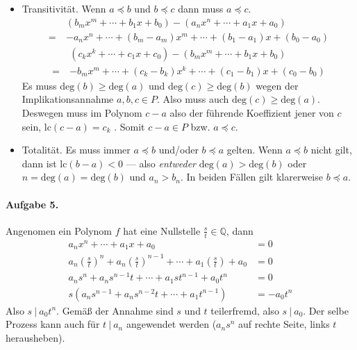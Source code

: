 \documentclass{article}
\begin{document}
\begin{enumerate}
\begin{itemize}
        \item Transitivität. Wenn $a \preccurlyeq b$ und $b \preccurlyeq c$ dann muss $a \preccurlyeq c$.
        \begin{align*}
            &(b_mx^m + \cdots + b_1x + b_0) - (a_nx^n + \cdots + a_1x + a_0) \\
            =\ &-a_nx^n + \cdots + (b_m - a_m)x^m + \cdots + (b_1 - a_1)x + (b_0 - a_0) 
        \end{align*}
        \begin{align*}
            &(c_kx^k + \cdots + c_1x + c_0) - (b_mx^m + \cdots + b_1x + b_0) \\
            =\ &-b_mx^m + \cdots + (c_k - b_k)x^k + \cdots + (c_1 - b_1)x + (c_0 - b_0) 
        \end{align*}
        Es muss $\text{deg}(b) \geq \text{deg}(a)$ und $\text{deg}(c) \geq \text{deg}(b)$ wegen der Implikationsannahme $a, b, c \in P$. Also muss auch $\text{deg}(c) \geq \text{deg}(a)$. Deswegen muss im Polynom $c - a$ also der führende Koeffizient jener von $c$ sein, $\text{lc}(c - a) = c_k$ . Somit $c - a \in P$ bzw. $a \preccurlyeq c$.
        

        \item Totalität. Es muss immer $a \preccurlyeq b$ und/oder $b \preccurlyeq a$ gelten. Wenn $a \preccurlyeq b$ nicht gilt, dann ist $\text{lc}(b - a) < 0$ --- also \emph{entweder} $\text{deg}(a) > \text{deg}(b)$ oder $n = \text{deg}(a) = \text{deg}(b)$ und $a_n > b_n$. In beiden Fällen gilt klarerweise $b \preccurlyeq a$.
    \end{itemize}
\end{enumerate}

\paragraph{Aufgabe 5.} Angenomen ein Polynom $f$ hat eine Nullstelle $\frac{s}{t} \in \mathbb{Q}$, dann
\begin{align*}
    a_nx^n + \cdots + a_1x + a_0 &= 0 \\
    a_n\left(\frac{s}{t}\right)^n + a_n\left(\frac{s}{t}\right)^{n - 1} + \cdots + a_1\left(\frac{s}{t}\right) + a_0 &= 0 \\
    a_ns^n + a_ns^{n - 1}t + \cdots + a_1st^{n - 1} + a_0t^n &= 0 \\
    s\left(a_ns^{n - 1} + a_ns^{n - 2}t + \cdots + a_1t^{n - 1}\right) &= -a_0t^n
\end{align*}
Also $s\ |\ a_0t^n$. Gemäß der Annahme sind $s$ und $t$ teilerfremd, also $s\ |\ a_0$. Der selbe Prozess kann auch für $t\ |\ a_n$ angewendet werden ($a_ns^n$ auf rechte Seite, links $t$ herausheben).
\end{document}
